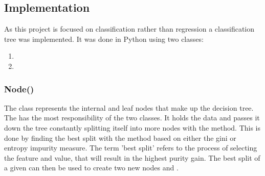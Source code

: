 \subsection{Implementation}
As this project is focused on classification rather than regression a classification tree was implemented.
It was done in Python using two classes:\\
\begin{enumerate}
    \item {}
    \item {}
    \end{enumerate}
\vspace{10pt}

\subsubsection{Node()}
The  class represents the internal and leaf nodes that make up the decision tree.
The  has the most responsibility of the two classes.
It holds the data and passes it down the tree constantly splitting itself into more nodes with the  method.
This is done by finding the best split with the  method based on either the gini or entropy impurity measure.
The term 'best split' refers to the process of selecting the feature and value, that will result in the highest purity gain.
The best split of a given  can then be used to create two new nodes  and .


